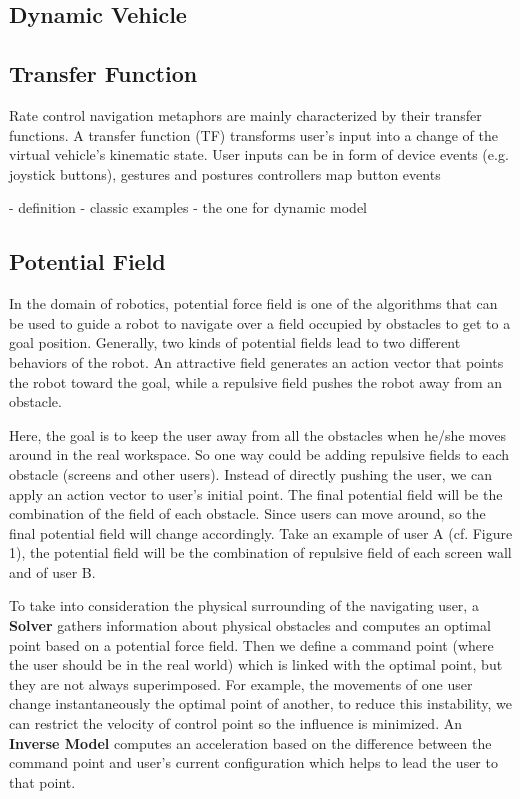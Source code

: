 \subsection{Dynamic Vehicle}


\subsection{Transfer Function}
Rate control navigation metaphors are mainly characterized by their transfer functions. A transfer function (TF) transforms user's input into a change of the virtual vehicle's kinematic state. User inputs can be in form of device events (e.g. joystick buttons), gestures and postures controllers map button events  

- definition
- classic examples
- the one for dynamic model


\subsection{Potential Field}
In the domain of robotics, potential force field is one of the algorithms that can be used to guide a robot to navigate over a field occupied by obstacles to get to a goal position. Generally, two kinds of potential fields lead to two different behaviors of the robot. An attractive field generates an action vector that points the robot toward the goal, while a repulsive field pushes the robot away from an obstacle.

Here, the goal is to keep the user away from all the obstacles when he/she moves around in the real workspace. So one way could be adding repulsive fields to each obstacle (screens and other users). Instead of directly pushing the user, we can apply an action vector to user's initial point. The final potential field will be the combination of the field of each obstacle. Since users can move around, so the final potential field will change accordingly. Take an example of user A (cf. Figure 1), the potential field will be the combination of repulsive field of each screen wall and of user B.

To take into consideration the physical surrounding of the navigating user, a \textbf{Solver} gathers information about physical obstacles and computes an optimal point based on a potential force field. Then we define a command point (where the user should be in the real world) which is linked with the optimal point, but they are not always superimposed. For example, the movements of one user change instantaneously the optimal point of another, to reduce this instability, we can restrict the velocity of control point so the influence is minimized. An \textbf{Inverse Model} computes an acceleration based on the difference between the command point and user's current configuration which helps to lead the user to that point.


